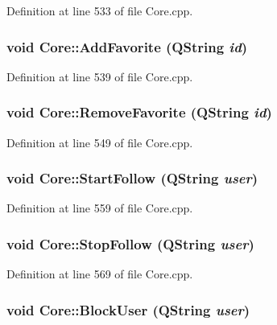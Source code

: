 Definition at line 533 of file Core.cpp.\hypertarget{classCore_dbeb18bcc46253950b7660582d2eb5f5}{
\subsubsection{\setlength{\rightskip}{0pt plus 5cm}void Core::AddFavorite (QString {\em id})}}
\label{classCore_dbeb18bcc46253950b7660582d2eb5f5}




Definition at line 539 of file Core.cpp.\hypertarget{classCore_c12e1d495cfea0a38c4adb38f258d27c}{
\subsubsection{\setlength{\rightskip}{0pt plus 5cm}void Core::RemoveFavorite (QString {\em id})}}
\label{classCore_c12e1d495cfea0a38c4adb38f258d27c}




Definition at line 549 of file Core.cpp.\hypertarget{classCore_5cd0ceaff4b8d19b40f9b2e00839a286}{
\subsubsection{\setlength{\rightskip}{0pt plus 5cm}void Core::StartFollow (QString {\em user})}}
\label{classCore_5cd0ceaff4b8d19b40f9b2e00839a286}




Definition at line 559 of file Core.cpp.\hypertarget{classCore_9a55db5cfe7788972b20d6a6bdc91218}{
\subsubsection{\setlength{\rightskip}{0pt plus 5cm}void Core::StopFollow (QString {\em user})}}
\label{classCore_9a55db5cfe7788972b20d6a6bdc91218}




Definition at line 569 of file Core.cpp.\hypertarget{classCore_e715888efd76cc27271e4050ebed4c0b}{
\subsubsection{\setlength{\rightskip}{0pt plus 5cm}void Core::BlockUser (QString {\em user})}}
\label{classCore_e715888efd76cc27271e4050ebed4c0b}





